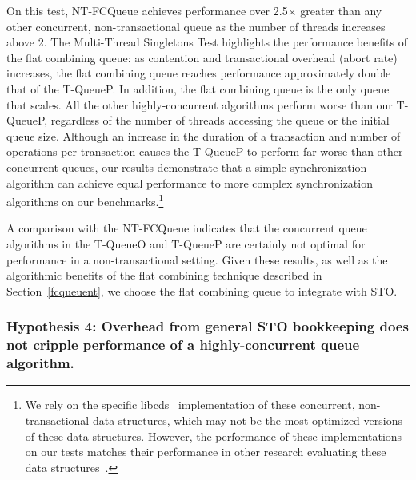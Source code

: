 On this test, NT-FCQueue achieves performance over 2.5$\times$ greater than any other concurrent, non-transactional queue as the number of threads increases above 2. The Multi-Thread Singletons Test highlights the performance benefits of the flat combining queue: as contention and transactional overhead (abort rate) increases, the flat combining queue reaches performance approximately double that of the T-QueueP. In addition, the flat combining queue is the only queue that scales. All the other highly-concurrent algorithms perform worse than our T-QueueP, regardless of the number of threads accessing the queue or the initial queue size. 
Although an increase in the duration of a transaction and number of operations per transaction causes the T-QueueP to perform far worse than other concurrent queues, our results demonstrate that a simple synchronization algorithm can achieve equal performance to more complex synchronization algorithms on our benchmarks.\footnote{We rely on the specific libcds~\cite{libcds} implementation of these concurrent, non-transactional data structures, which may not be the most optimized versions of these data structures. However, the performance of these implementations on our tests matches their performance in other research evaluating these data structures~\cite{queue1, queue3}.}

A comparison with the NT-FCQueue indicates that the concurrent queue algorithms in the T-QueueO and T-QueueP are certainly not optimal for performance in a non-transactional setting.
Given these results, as well as the algorithmic benefits of the flat combining technique described in Section~\ref{fcqueuent}, we choose the flat combining queue to integrate with STO.

\vspace{12pt}
\noindent{}

\subsubsection{Hypothesis 4: Overhead from general STO bookkeeping does not cripple performance of a highly-concurrent queue algorithm.}

